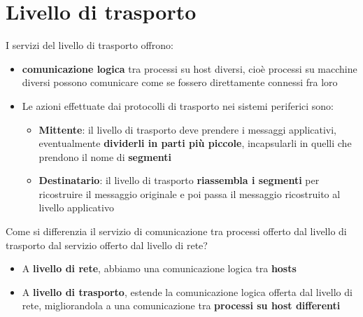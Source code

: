 \documentclass[12pt]{article}
\begin{document}
\section{Livello di trasporto}
I servizi del livello di trasporto offrono:
\begin{itemize}
    \item \textbf{comunicazione logica} tra processi su host diversi, cioè processi su macchine diversi possono comunicare come se fossero direttamente connessi fra loro
    \item Le azioni effettuate dai protocolli di trasporto nei sistemi periferici sono:
    \begin{itemize}
        \item \textbf{Mittente}: il livello di trasporto deve prendere i messaggi applicativi, eventualmente \textbf{dividerli in parti più piccole}, incapsularli in quelli che prendono il nome di \textbf{segmenti}
        \item \textbf{Destinatario}: il livello di trasporto \textbf{riassembla i segmenti} per ricostruire il messaggio originale e poi passa il messaggio ricostruito al livello applicativo
    \end{itemize}
\end{itemize}
Come si differenzia il servizio di comunicazione tra processi offerto dal livello di trasporto dal servizio offerto dal livello di rete?
\begin{itemize}
    \item A \textbf{livello di rete}, abbiamo una comunicazione logica tra \textbf{hosts}
    \item A \textbf{livello di trasporto}, estende la comunicazione logica offerta dal livello di rete, migliorandola a una comunicazione tra \textbf{processi su host differenti}  
\end{itemize}
\end{document}
